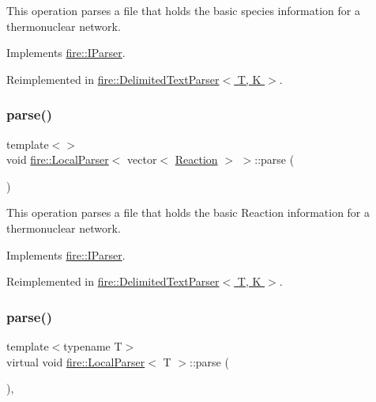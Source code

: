 This operation parses a file that holds the basic species information for a thermonuclear network. 

Implements \hyperlink{a00818_af36ac6eedd8c27d2f418869193d7d03c}{fire\+::\+I\+Parser}.



Reimplemented in \hyperlink{a00806_a773fa7ed28cb9d8c384ad94bd81fc93f}{fire\+::\+Delimited\+Text\+Parser$<$ T, K $>$}.

\mbox{\label{a00826_a34fd9ffb0196c612c75b5288ed5e219b}} 
\subsubsection{\texorpdfstring{parse()}{parse()}\hspace{0.1cm}{\footnotesize\ttfamily [2/3]}}
{\footnotesize\ttfamily template$<$$>$ \\
void \hyperlink{a00826}{fire\+::\+Local\+Parser}$<$ vector$<$ \hyperlink{a00758}{Reaction} $>$ $>$\+::parse (\begin{DoxyParamCaption}{ }\end{DoxyParamCaption})\hspace{0.3cm}{\ttfamily [virtual]}}

This operation parses a file that holds the basic Reaction information for a thermonuclear network. 

Implements \hyperlink{a00818_af36ac6eedd8c27d2f418869193d7d03c}{fire\+::\+I\+Parser}.



Reimplemented in \hyperlink{a00806_a773fa7ed28cb9d8c384ad94bd81fc93f}{fire\+::\+Delimited\+Text\+Parser$<$ T, K $>$}.

\mbox{\label{a00826_abd8929aea06c2dda40256d2e58236650}} 
\subsubsection{\texorpdfstring{parse()}{parse()}\hspace{0.1cm}{\footnotesize\ttfamily [3/3]}}
{\footnotesize\ttfamily template$<$typename T$>$ \\
virtual void \hyperlink{a00826}{fire\+::\+Local\+Parser}$<$ T $>$\+::parse (\begin{DoxyParamCaption}{ }\end{DoxyParamCaption})\hspace{0.3cm}{\ttfamily [inline]}, {\ttfamily [virtual]}}

